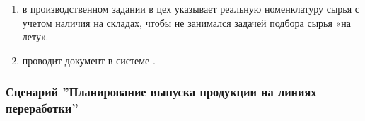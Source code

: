 \begin{enumerate}
\item 	\planner в производственном задании в цех  указывает реальную номенклатуру сырья с учетом наличия на складах, чтобы \gaoperator не занимался задачей подбора сырья «на лету».
\item	\planner проводит документ   в системе \gofro.


\end{enumerate}

\subsubsection{Сценарий ''Планирование выпуска продукции на линиях переработки''}
\label{bp:plan_3b}


